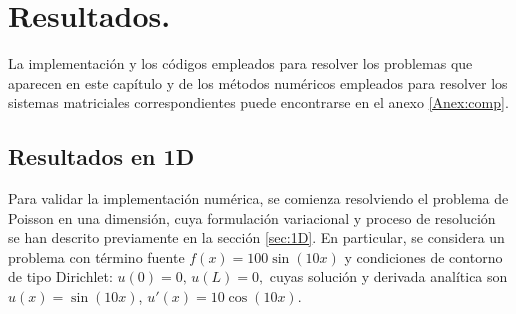 \documentclass[11pt]{book}
\theoremstyle{plain} %
\theoremstyle{definition} %
\theoremstyle{definition} %
\begin{document}
\chapter{Resultados.}\label{chap4}
\vspace{-1cm}

La implementación y los códigos empleados para resolver los problemas que aparecen en este capítulo y
de los métodos numéricos empleados para resolver los sistemas matriciales correspondientes puede encontrarse en el anexo \ref{Anex:comp}.

\section{Resultados en 1D}

Para validar la implementación numérica, se comienza resolviendo el problema de Poisson en una dimensión, cuya
formulación variacional y proceso de resolución se han descrito previamente en la sección
\ref{sec:1D}. En particular, se considera un problema con término fuente $f(x)=100 \sin\left(10 x\right)$ y condiciones de contorno de tipo Dirichlet:
$u(0)=0, \, u(L)=0,$    %
\noindent cuyas solución y derivada analítica son $u(x)=\sin(10x)$, $u'(x)=10\cos(10x).$

\vspace{-0.3cm}
\end{document}
